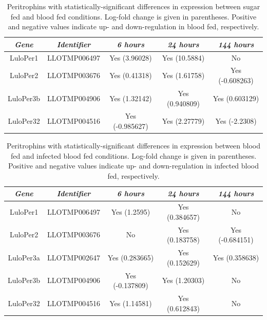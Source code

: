 \begin{table}[H]
  \centering
  \begin{tabular}{ c c c c c } \hline
    \emph{Gene} & \emph{Identifier} & \emph{6 hours} & \emph{24 hours} & \emph{144 hours} \\ \hline
    LuloPer1 & LLOTMP006497 & Yes (3.96028) & Yes (10.5884) & No \\
    LuloPer2 & LLOTMP003676 & Yes (0.41318) & Yes (1.61758) & Yes (-0.608263) \\
    LuloPer3b & LLOTMP004906 & Yes (1.32142) & Yes (0.940809) & Yes (0.603129) \\
    LuloPer32 & LLOTMP004516 & Yes (-0.985627) & Yes (2.27779) & Yes (-2.2308)
  \end{tabular}
  \caption{Peritrophins with statistically-significant differences in expression between sugar fed and blood fed conditions. Log-fold change is given in parentheses. Positive and negative values indicate up- and down-regulation in blood fed, respectively.}
  \label{tab:sandflies:stat-sig-peritrophins-sb}
\end{table}

\begin{table}[H]
  \centering
  \begin{tabular}{ c c c c c } \hline
    \emph{Gene} & \emph{Identifier} & \emph{6 hours} & \emph{24 hours} & \emph{144 hours} \\ \hline
    LuloPer1 & LLOTMP006497 & Yes (1.2595) & Yes (0.384657) & No \\
    LuloPer2 & LLOTMP003676 & No & Yes (0.183758) & Yes (-0.684151) \\
    LuloPer3a & LLOTMP002647 & Yes (0.283665) & Yes (0.152629) & Yes (0.358638) \\
    LuloPer3b & LLOTMP004906 & Yes (-0.137809) & Yes (1.20303) & No \\
    LuloPer32 & LLOTMP004516 & Yes (1.14581) & Yes (0.612843) & No
  \end{tabular}
  \caption{Peritrophins with statistically-significant differences in expression between blood fed and infected blood fed conditions. Log-fold change is given in parentheses. Positive and negative values indicate up- and down-regulation in infected blood fed, respectively.}
  \label{tab:sandflies:stat-sig-peritrophins-bi}
\end{table}





